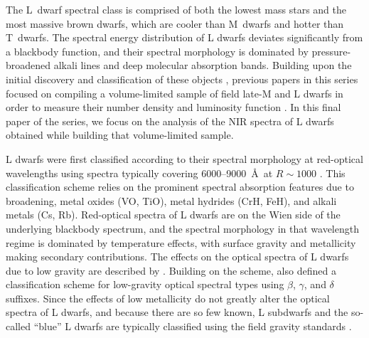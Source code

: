\documentclass[12pt,preprint]{aastex}
\begin{document}
The L~dwarf spectral class is comprised of both the lowest mass stars and the most massive brown dwarfs, which are cooler than M~dwarfs and hotter than T~dwarfs. 
The spectral energy distribution of L dwarfs deviates significantly from a blackbody function, and their spectral morphology is dominated by pressure-broadened alkali lines and deep molecular absorption bands.
Building upon the initial discovery and classification of these objects \citep{K99,Martin99,Kirkpatrick05}, previous papers in this series focused on compiling a volume-limited sample of field late-M and L dwarfs in order to measure their number density and luminosity function \citep[Papers V, IX, and X]{Cruz03,Cruz07,Reid08}. 
In this final paper of the series, we focus on the analysis of the NIR spectra of L dwarfs obtained while building that volume-limited sample.

L dwarfs were first classified according to their spectral morphology at red-optical wavelengths using spectra typically covering 6000--9000~\AA~at $R\sim1000$ \citep{Martin99,K99,Kirkpatrick05}. 
This classification scheme relies on the prominent spectral absorption features due to  broadening, metal oxides (VO, TiO), metal hydrides (CrH, FeH), and alkali metals (Cs, Rb).
Red-optical spectra of L dwarfs are on the Wien side of the underlying blackbody spectrum, and the spectral morphology in that wavelength regime is dominated by temperature effects, with surface gravity and metallicity making secondary contributions. 
The effects on the optical spectra of L dwarfs due to low gravity are described by \citet{Kirkpatrick06,Kirkpatrick08, Cruz09_lowg}. 
Building on the \citet{K99} scheme, \citet{Cruz09_lowg} also defined a classification scheme for low-gravity optical spectral types using $\beta$, $\gamma$, and $\delta$ suffixes. 
Since the effects of low metallicity do not greatly alter the optical spectra of L dwarfs, and because there are so few known, L subdwarfs and the so-called ``blue'' L dwarfs are typically  classified using the field gravity standards \citep{Burgasser07_subdwarfs, Burgasser08_blue, Kirkpatrick10, Kirkpatrick:2014kv}.
\end{document}
